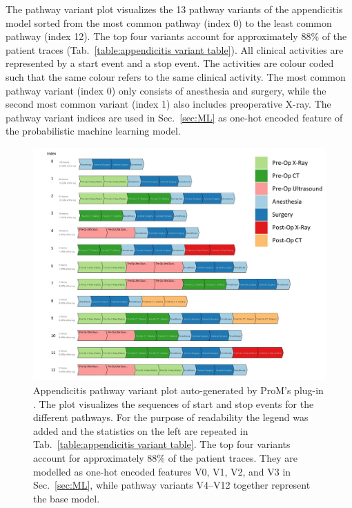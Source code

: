 The pathway variant plot visualizes the 13 pathway variants of the
appendicitis model sorted from the most common pathway (index 0) to
the least common pathway (index 12).
The top four variants account for approximately 88\% of the patient
traces (Tab.~\ref{table:appendicitis variant table}).
All clinical activities are represented by a start event and a stop
event.
The activities are colour coded such that the same colour refers to the same clinical activity. The most common pathway variant (index 0) only consists of anesthesia and surgery, while the second most common variant (index 1) also includes preoperative X-ray.
The pathway variant indices are used in Sec.~\ref{sec:ML} as one-hot
encoded feature of the probabilistic machine learning model.

\begin{figure}[t]
\hspace{-2cm}
\includegraphics[width=1.5\textwidth]{images/appendicitis_variant_index_anes.jpg}
\caption{Appendicitis pathway variant plot auto-generated by ProM's
  plug-in . 
  The plot visualizes the sequences of start and stop events for the different pathways.
  For the purpose of readability the legend was added and the
  statistics on the left are repeated in Tab.~\ref{table:appendicitis variant table}.
 The top four variants account for approximately 88\% of the patient
 traces. They are modelled as one-hot encoded features V0, V1, V2, and V3
 in Sec.~\ref{sec:ML}, while pathway variants V4--V12 together represent
 the base model.
 }
\label{fig:appendicitis pathway variants}
\end{figure}
\clearpage

